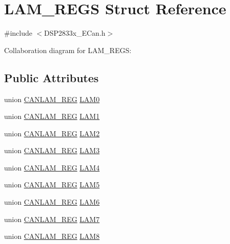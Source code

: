\hypertarget{struct_l_a_m___r_e_g_s}{}\section{L\+A\+M\+\_\+\+R\+E\+G\+S Struct Reference}
\label{struct_l_a_m___r_e_g_s}


{\ttfamily \#include $<$D\+S\+P2833x\+\_\+\+E\+Can.\+h$>$}



Collaboration diagram for L\+A\+M\+\_\+\+R\+E\+G\+S\+:
\subsection*{Public Attributes}
\begin{DoxyCompactItemize}
\item 
union \hyperlink{union_c_a_n_l_a_m___r_e_g}{C\+A\+N\+L\+A\+M\+\_\+\+R\+E\+G} \hyperlink{struct_l_a_m___r_e_g_s_ad33be018f43ca32c9f563833d1e6d778}{L\+A\+M0}
\item 
union \hyperlink{union_c_a_n_l_a_m___r_e_g}{C\+A\+N\+L\+A\+M\+\_\+\+R\+E\+G} \hyperlink{struct_l_a_m___r_e_g_s_a94f06455b4e1fbb157e168e9cf4f6972}{L\+A\+M1}
\item 
union \hyperlink{union_c_a_n_l_a_m___r_e_g}{C\+A\+N\+L\+A\+M\+\_\+\+R\+E\+G} \hyperlink{struct_l_a_m___r_e_g_s_a76be187994e640a957bba265bd132250}{L\+A\+M2}
\item 
union \hyperlink{union_c_a_n_l_a_m___r_e_g}{C\+A\+N\+L\+A\+M\+\_\+\+R\+E\+G} \hyperlink{struct_l_a_m___r_e_g_s_a3d231b94343d8414286961497ee0100e}{L\+A\+M3}
\item 
union \hyperlink{union_c_a_n_l_a_m___r_e_g}{C\+A\+N\+L\+A\+M\+\_\+\+R\+E\+G} \hyperlink{struct_l_a_m___r_e_g_s_ae3fbaec52dbb363952c075b2a84b2d2c}{L\+A\+M4}
\item 
union \hyperlink{union_c_a_n_l_a_m___r_e_g}{C\+A\+N\+L\+A\+M\+\_\+\+R\+E\+G} \hyperlink{struct_l_a_m___r_e_g_s_ade30cfa38f2be4fa29d31caeb59aa432}{L\+A\+M5}
\item 
union \hyperlink{union_c_a_n_l_a_m___r_e_g}{C\+A\+N\+L\+A\+M\+\_\+\+R\+E\+G} \hyperlink{struct_l_a_m___r_e_g_s_a88d68f53187d46b4f950e28154e95fe3}{L\+A\+M6}
\item 
union \hyperlink{union_c_a_n_l_a_m___r_e_g}{C\+A\+N\+L\+A\+M\+\_\+\+R\+E\+G} \hyperlink{struct_l_a_m___r_e_g_s_ad3b3100a91c5e677cf09de87e748c4a6}{L\+A\+M7}
\item 
union \hyperlink{union_c_a_n_l_a_m___r_e_g}{C\+A\+N\+L\+A\+M\+\_\+\+R\+E\+G} \hyperlink{struct_l_a_m___r_e_g_s_a4f819f8c01fda93433830393b9b332b2}{L\+A\+M8}

\end{DoxyCompactItemize}
